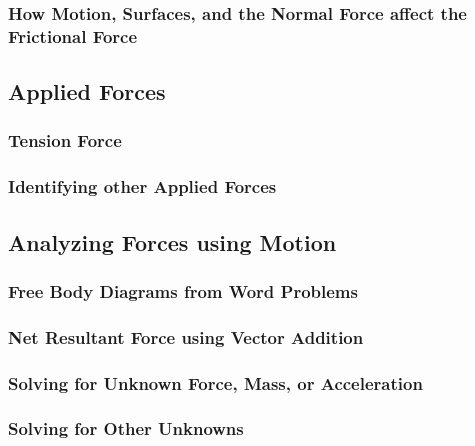 \documentclass[../main-physics-problems.tex]{subfiles}
\begin{document}
\subsubsection{How Motion, Surfaces, and the Normal Force affect the Frictional Force}
\subsection{Applied Forces}
\subsubsection{Tension Force}
\subsubsection{Identifying other Applied Forces}
\subsection{Analyzing Forces using Motion}
\subsubsection{Free Body Diagrams from Word Problems}
\subsubsection{Net Resultant Force using Vector Addition}
\subsubsection{Solving for Unknown Force, Mass, or Acceleration}
\subsubsection{Solving for Other Unknowns}
\end{document}
